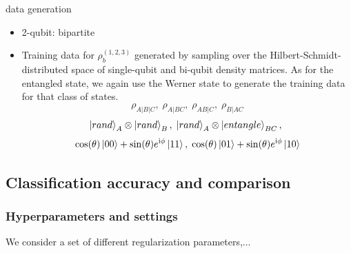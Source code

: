 \documentclass[
10pt,
aps,
pra,
linenumbers,
floatfix,
]{revtex4-2}
\theoremstyle{plain}
\theoremstyle{definition}
\newcommand{\dm}{\rho}
\begin{document}
data generation
\begin{itemize}
	\item 2-qubit: bipartite
	\item Training data for $\dm_b^{(1,2,3)}$ generated by sampling over the Hilbert-Schmidt-distributed space of single-qubit and bi-qubit density matrices. As for the entangled state, we again use the Werner state to generate the training data for that class of states.
	\begin{equation}
		\dm_{A|B|C},\;
		\dm_{A|BC},\;
		\dm_{AB|C},\;
		\dm_{B|AC}
	\end{equation}
	\begin{equation}
		\ket{rand}_A \otimes \ket{rand}_B,\;
		\ket{rand}_A \otimes \ket{entangle}_{BC},\;
	\end{equation}
	\begin{equation}
		\cos(\theta) \ket{00} + \sin(\theta)e^{\textup{i} \phi} \ket{11}
		,\;
		\cos(\theta) \ket{01} + \sin(\theta)e^{\textup{i} \phi} \ket{10}
	\end{equation}
\end{itemize}

\subsection{Classification accuracy and comparison}
\subsubsection{Hyperparameters and settings}
We consider a set of different regularization parameters,...
\end{document}
